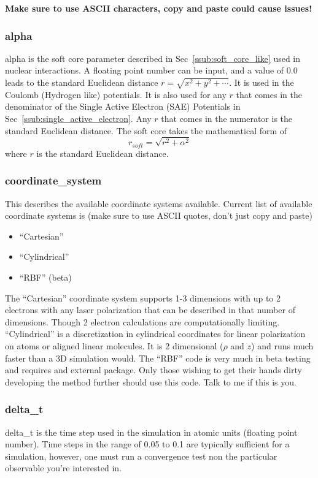 \documentclass{article}
\begin{document}
\textbf{Make sure to use ASCII characters, copy and paste could cause issues!}

\subsubsection{alpha}
alpha is the soft core parameter described in Sec~\ref{ssub:soft_core_like} used in nuclear interactions. A floating point number can be input, and a value of 0.0 leads to the standard Euclidean distance $r=\sqrt{x^2+y^2+\cdots}$. It is used in the Coulomb (Hydrogen like) potentials. It is also used for any $r$ that comes in the denominator of the Single Active Electron (SAE) Potentials in Sec~\ref{ssub:single_active_electron}. Any $r$ that comes in the numerator is the standard Euclidean distance. The soft core takes the mathematical form of
\begin{equation}
  r_{soft} = \sqrt{r^2 + \alpha^2}
\end{equation}
where $r$ is the standard Euclidean distance.

\subsubsection{coordinate\_system}
This describes the available coordinate systems available. Current list of available coordinate systems is (make sure to use ASCII quotes, don't just copy and paste)
\begin{itemize}
  \item ``Cartesian''
  \item ``Cylindrical''
  \item ``RBF'' (beta)
\end{itemize}
The ``Cartesian'' coordinate system supports 1-3 dimensions with up to 2 electrons with any laser polarization that can be described in that number of dimensions. Though 2 electron calculations are computationally limiting. ``Cylindrical'' is a discretization in cylindrical coordinates for linear polarization on atoms or aligned linear molecules. It is 2 dimensional ($\rho$ and $z$) and runs much faster than a 3D simulation would. The ``RBF'' code is very much in beta testing and requires and external package. Only those wishing to get their hands dirty developing the method further should use this code. Talk to me if this is you.

\subsubsection{delta\_t}
delta\_t is the time step used in the simulation in atomic units (floating point number). Time steps in the range of 0.05 to 0.1 are typically sufficient for a simulation, however, one must run a convergence test non the particular observable you're interested in.
\end{document}
